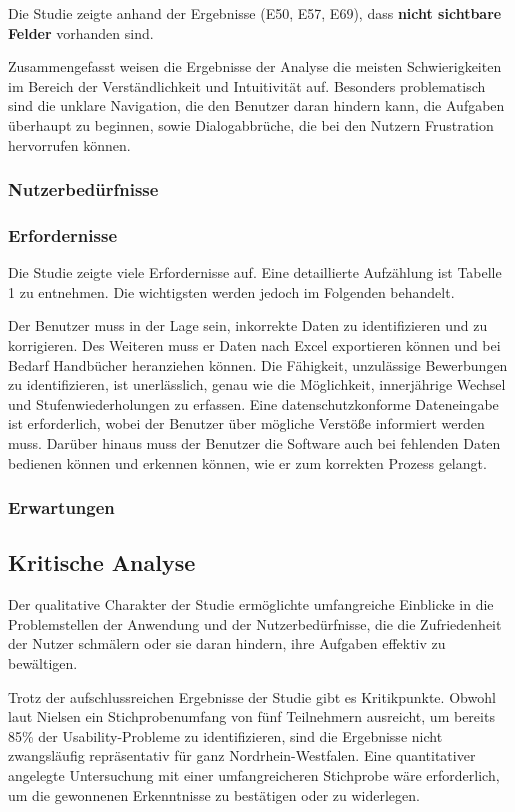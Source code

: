 Die Studie zeigte anhand der Ergebnisse (E50, E57, E69), dass \textbf{nicht sichtbare Felder} vorhanden sind.

Zusammengefasst weisen die Ergebnisse der Analyse die meisten Schwierigkeiten im Bereich der Verständlichkeit und Intuitivität auf. Besonders problematisch sind die unklare Navigation, die den Benutzer daran hindern kann, die Aufgaben überhaupt zu beginnen, sowie Dialogabbrüche, die bei den Nutzern Frustration hervorrufen können.

\subsubsection{Nutzerbedürfnisse}

\subsubsection{Erfordernisse}
Die Studie zeigte viele Erfordernisse auf. Eine detaillierte Aufzählung ist Tabelle 1 zu entnehmen. Die wichtigsten werden jedoch im Folgenden behandelt.

Der Benutzer muss in der Lage sein, inkorrekte Daten zu identifizieren und zu korrigieren. Des Weiteren muss er Daten nach Excel exportieren können und bei Bedarf Handbücher heranziehen können. Die Fähigkeit, unzulässige Bewerbungen zu identifizieren, ist unerlässlich, genau wie die Möglichkeit, innerjährige Wechsel und Stufenwiederholungen zu erfassen. Eine datenschutzkonforme Dateneingabe ist erforderlich, wobei der Benutzer über mögliche Verstöße informiert werden muss. Darüber hinaus muss der Benutzer die Software auch bei fehlenden Daten bedienen können und erkennen können, wie er zum korrekten Prozess gelangt.

\subsubsection{Erwartungen}





\subsection{Kritische Analyse}
Der qualitative Charakter der Studie ermöglichte umfangreiche Einblicke in die Problemstellen der Anwendung und der Nutzerbedürfnisse, die die Zufriedenheit der Nutzer schmälern oder sie daran hindern, ihre Aufgaben effektiv zu bewältigen. 

Trotz der aufschlussreichen Ergebnisse der Studie gibt es Kritikpunkte. Obwohl laut Nielsen ein Stichprobenumfang von fünf Teilnehmern ausreicht, um bereits 85\% der Usability-Probleme zu identifizieren\cite{Nielsen5Teilnehmer}, sind die Ergebnisse nicht zwangsläufig repräsentativ für ganz Nordrhein-Westfalen. Eine quantitativer angelegte Untersuchung mit einer umfangreicheren Stichprobe wäre erforderlich, um die gewonnenen Erkenntnisse zu bestätigen oder zu widerlegen.

